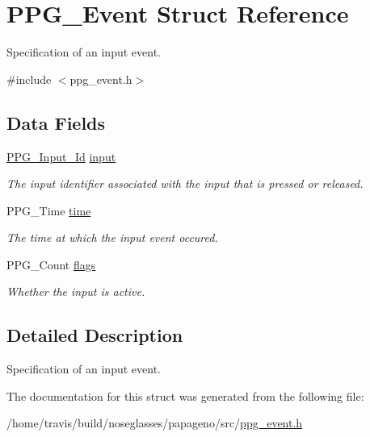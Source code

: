 \hypertarget{structPPG__Event}{\section{P\-P\-G\-\_\-\-Event Struct Reference}
\label{structPPG__Event}
}


Specification of an input event.  




{\ttfamily \#include $<$ppg\-\_\-event.\-h$>$}

\subsection*{Data Fields}
\begin{DoxyCompactItemize}
\item 
\hypertarget{structPPG__Event_a5ceb5559b13ec16851602cc690b3c06b}{\hyperlink{ppg__input_8h_a83636f010a52c9de62d0425629f0a158}{P\-P\-G\-\_\-\-Input\-\_\-\-Id} \hyperlink{structPPG__Event_a5ceb5559b13ec16851602cc690b3c06b}{input}}\label{structPPG__Event_a5ceb5559b13ec16851602cc690b3c06b}

\begin{DoxyCompactList}\small\item\em The input identifier associated with the input that is pressed or released. \end{DoxyCompactList}\item 
\hypertarget{structPPG__Event_a4c3d84d08883afeb1f04aa44f35d3fa5}{P\-P\-G\-\_\-\-Time \hyperlink{structPPG__Event_a4c3d84d08883afeb1f04aa44f35d3fa5}{time}}\label{structPPG__Event_a4c3d84d08883afeb1f04aa44f35d3fa5}

\begin{DoxyCompactList}\small\item\em The time at which the input event occured. \end{DoxyCompactList}\item 
\hypertarget{structPPG__Event_a2d8d2da39aff087b530872e0375e8d1c}{P\-P\-G\-\_\-\-Count \hyperlink{structPPG__Event_a2d8d2da39aff087b530872e0375e8d1c}{flags}}\label{structPPG__Event_a2d8d2da39aff087b530872e0375e8d1c}

\begin{DoxyCompactList}\small\item\em Whether the input is active. \end{DoxyCompactList}\end{DoxyCompactItemize}


\subsection{Detailed Description}
Specification of an input event. 

The documentation for this struct was generated from the following file\-:\begin{DoxyCompactItemize}
\item 
/home/travis/build/noseglasses/papageno/src/\hyperlink{ppg__event_8h}{ppg\-\_\-event.\-h}\end{DoxyCompactItemize}
